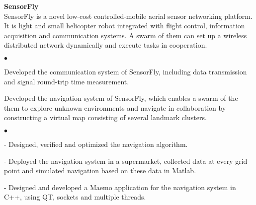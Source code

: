 \documentclass[margin,line]{res}
\newenvironment{list1}{
  \begin{list}{\ding{113}}{
      \setlength{\itemsep}{0in}
      \setlength{\parsep}{0in} \setlength{\parskip}{0in}
      \setlength{\topsep}{0in} \setlength{\partopsep}{0in}
      \setlength{\leftmargin}{0.17in}}}{\end{list}}
\newenvironment{list2}{
  \begin{list}{$\bullet$}{
      \setlength{\itemsep}{0in}
      \setlength{\parsep}{0in} \setlength{\parskip}{0in}
      \setlength{\topsep}{0in} \setlength{\partopsep}{0in}
      \setlength{\leftmargin}{0.2in}}}{\end{list}}
\begin{document}
\begin{resume}
\begin{list1}
        \vspace*{.1in}
        \item[] {\bf SensorFly}\\
        SensorFly is a novel low-cost controlled-mobile aerial sensor networking platform. It is light and small helicopter robot integrated with flight control, information acquisition and communication systems. A swarm of them can set up a wireless distributed network dynamically and execute tasks in cooperation.%
        \vspace*{.05in}
        \begin{list2}
          \item Developed the communication system of SensorFly, including data transmission and signal round-trip time measurement.
          \item Developed the navigation system of SensorFly, which enables a swarm of the them to explore unknown environments and navigate in collaboration by constructing a virtual map consisting of several landmark clusters.%
          \begin{list2}
            \item[-] Designed, verified and optimized the navigation algorithm.
            \item[-] Deployed the navigation system in a supermarket, collected data at every grid point and simulated navigation based on these data in Matlab.
            \item[-] Designed and developed a Maemo application for the navigation system in C++, using QT, sockets and multiple threads.
          \end{list2}
        \end{list2}


\end{list1}
\end{resume}
\end{document}
